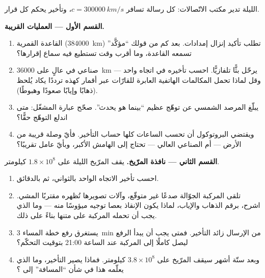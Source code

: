 \begin{problem}\label{pb:g8:speed-of-light:1}
الليلة تدير مكتب الاتّصالات: كل رسالة تسافر 
$c = \qty{300000}{km/s}$، وتأخير  يحكم كل قرار.

\medskip\noindent\textbf{القسم الأول --- العمليات القريبة.}
\begin{enumerate}
  \item القاعدة القمرية (\qty{384000}{km}) تطلب تأكيد إنزال
        إمدادات. بعد كم من قولك ``مؤكَّد'' تسمعه القاعدة، وما
        أقرب وقت تستطيع فيه سماع إقرارها؟
  \item {} صناعي في  عالٍ على \qty{36000}{km} يرحّل بثًّا
        تلفازيًّا. احسب تأخيره في اتجاه واحد --- وقل لماذا
        تحمل المكالمات الهاتفية العابرة للقارّات عبر أقمار
        كهذه ترددًا يكاد يُلحظ (ذهابًا وإيابًا صعودًا
        وهبوطًا).
  \item يبلّغ المرصد الشمسي عن توهّج عظيم ``بينما هو يحدث''.
        صحّح عبارة المشغّل: متى اندلع التوهّج حقًّا؟
  \item ويقتضي البروتوكول أن تحسب الساعات كلها حساب التأخير.
        فأيّ وصلة قريبة من الأرض ---  أم  الصناعي
        العالي --- تحتاج إلى الهامش الأكبر، وبأيّ عامل
        تقريبًا؟
\end{enumerate}

\medskip\noindent\textbf{القسم الثاني --- نافذة المرّيخ.}
يقف المرّيخ الليلة على $1.8 \times 10^{8}$ كيلومتر.
\begin{enumerate}[resume]
  \item احسب تأخير الاتجاه الواحد بالثواني، ثم بالدقائق.
  \item تلقى المركبة الجوّالة صدعًا غير متوقّع، وآلات تصويرها
        تُظهره مقتربًا  المشي. اشرح، برقم الذهاب
        والإياب، لماذا يكون الإنقاذ بعصا توجيه ميؤوسًا منه ---
        وما الذي يجب أن تحمله المركبة على متنها بناءً على
        ذلك.
  \item يستغرق رفع خطة المساء \qty{3}{min} من الإرسال زائد
        التأخير. فمتى يجب أن يبدأ الرفع ليصل كاملًا إلى
        المركبة عند الساعة 21:00 بتوقيت التحكّم؟
  \item وبعد ستّة أشهر سيقف المرّيخ على $3.8 \times 10^{8}$
        كيلومتر. فماذا يصير التأخير، وما الذي يعلّمه هذا في
        شأن ``المسافة'' إلى ؟
\end{enumerate}


\end{problem}
